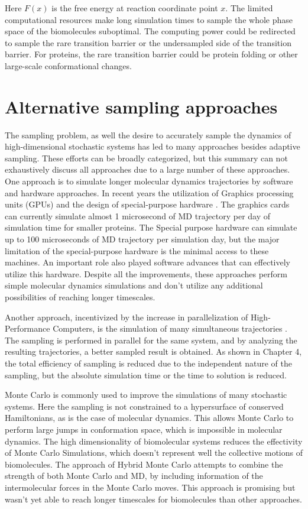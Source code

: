 Here $F(x)$ is the free energy at reaction coordinate point $x$. The limited computational resources make long simulation times to sample the whole phase space of the biomolecules suboptimal. The computing power could be redirected to sample the rare transition barrier or the undersampled side of the transition barrier. For proteins, the rare transition barrier could be protein folding or other large-scale conformational changes.


\section{\label{sec:intro2}Alternative sampling approaches}

The sampling problem, as well the desire to accurately sample the dynamics of high-dimensional stochastic systems has led to many approaches besides adaptive sampling.
These efforts can be broadly categorized, but this summary can not exhaustively discuss all approaches due to a large number of these approaches.
One approach is to simulate longer molecular dynamics trajectories by software and hardware approaches. In recent years the utilization of Graphics processing units (GPUs) and the design of special-purpose hardware \cite{shaw2014anton}. The graphics cards can currently simulate almost 1 microsecond of MD trajectory per day of simulation time for smaller proteins. The Special purpose hardware can simulate up to 100 microseconds of MD trajectory per simulation day, but the major limitation of the special-purpose hardware is the minimal access to these machines. An important role also played software advances that can effectively utilize this hardware. Despite all the improvements, these approaches perform simple molecular dynamics simulations and don't utilize any additional possibilities of reaching longer timescales.

Another approach, incentivized by the increase in parallelization of High-Performance Computers, is the simulation of many simultaneous trajectories \cite{DistComp-Shirts2000, DistComp-Buch2010}. The sampling is performed in parallel for the same system, and by analyzing the resulting trajectories, a better sampled result is obtained.  As shown in Chapter 4, the total efficiency of sampling is reduced due to the independent nature of the sampling, but the absolute simulation time or the time to solution is reduced.

Monte Carlo is commonly used to improve the simulations of many stochastic systems. Here the sampling is not constrained to a hypersurface of conserved Hamiltonians, as is the case of molecular dynamics. This allows Monte Carlo to perform large jumps in conformation space, which is impossible in molecular dynamics. The high dimensionality of biomolecular systems reduces the effectivity of Monte Carlo Simulations, which doesn't represent well the collective motions of biomolecules. The approach of Hybrid Monte Carlo attempts to combine the strength of both Monte Carlo and MD, by including information of the intermolecular forces in the Monte Carlo moves. This approach is promising but wasn't yet able to reach longer timescales for biomolecules than other approaches. 


